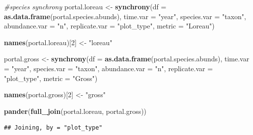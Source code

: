 \documentclass[]{article}
\newenvironment{Shaded}{\begin{snugshade}}{\end{snugshade}}
\newcommand{\KeywordTok}[1]{\textcolor[rgb]{0.13,0.29,0.53}{\textbf{{#1}}}}
\newcommand{\DataTypeTok}[1]{\textcolor[rgb]{0.13,0.29,0.53}{{#1}}}
\newcommand{\DecValTok}[1]{\textcolor[rgb]{0.00,0.00,0.81}{{#1}}}
\newcommand{\StringTok}[1]{\textcolor[rgb]{0.31,0.60,0.02}{{#1}}}
\newcommand{\CommentTok}[1]{\textcolor[rgb]{0.56,0.35,0.01}{\textit{{#1}}}}
\newcommand{\NormalTok}[1]{{#1}}
\begin{document}
\begin{Shaded}
\begin{Highlighting}[]
\CommentTok{#species synchrony}
\NormalTok{portal.loreau <-}\StringTok{ }\KeywordTok{synchrony}\NormalTok{(}\DataTypeTok{df =} \KeywordTok{as.data.frame}\NormalTok{(portal.species.abunds),}
                           \DataTypeTok{time.var =} \StringTok{"year"}\NormalTok{,}
                           \DataTypeTok{species.var =} \StringTok{"taxon"}\NormalTok{,}
                           \DataTypeTok{abundance.var =} \StringTok{"n"}\NormalTok{,}
                           \DataTypeTok{replicate.var =} \StringTok{"plot_type"}\NormalTok{,}
                           \DataTypeTok{metric =} \StringTok{"Loreau"}\NormalTok{)}

\KeywordTok{names}\NormalTok{(portal.loreau)[}\DecValTok{2}\NormalTok{] <-}\StringTok{ "loreau"}

\NormalTok{portal.gross <-}\StringTok{ }\KeywordTok{synchrony}\NormalTok{(}\DataTypeTok{df =} \KeywordTok{as.data.frame}\NormalTok{(portal.species.abunds),}
                          \DataTypeTok{time.var =} \StringTok{"year"}\NormalTok{,}
                          \DataTypeTok{species.var =} \StringTok{"taxon"}\NormalTok{,}
                          \DataTypeTok{abundance.var =} \StringTok{"n"}\NormalTok{,}
                          \DataTypeTok{replicate.var =} \StringTok{"plot_type"}\NormalTok{,}
                          \DataTypeTok{metric =} \StringTok{"Gross"}\NormalTok{)}

\KeywordTok{names}\NormalTok{(portal.gross)[}\DecValTok{2}\NormalTok{] <-}\StringTok{ "gross"}

\KeywordTok{pander}\NormalTok{(}\KeywordTok{full_join}\NormalTok{(portal.loreau, portal.gross))}
\end{Highlighting}
\end{Shaded}

\begin{verbatim}
## Joining, by = "plot_type"
\end{verbatim}
\end{document}
